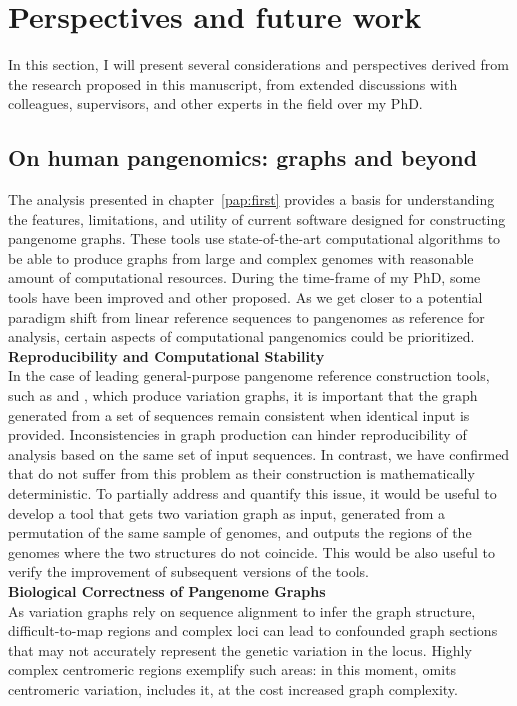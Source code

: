 
\chapter{Perspectives and future work}
\label{sec:perspectives}
In this section, I will present several considerations and perspectives derived from the research proposed in this manuscript, from extended discussions with colleagues, supervisors, and other experts in the field over my PhD.

\section{On human pangenomics: graphs and beyond}
The analysis presented in chapter~\ref{pap:first} provides a basis for understanding the features, limitations, and utility of current software designed for constructing pangenome graphs. These tools use state-of-the-art computational algorithms to be able to produce graphs from large and complex genomes with reasonable amount of computational resources. During the time-frame of my PhD, some tools have been improved and other proposed. As we get closer to a potential paradigm shift from linear reference sequences to pangenomes as reference for analysis, certain aspects of computational pangenomics could be prioritized. \\
\textbf{Reproducibility and Computational Stability}\\
In the case of leading general-purpose pangenome reference construction tools, such as \pggb and \mcactus, which produce variation graphs, it is important that the graph generated from a set of sequences remain consistent when identical input is provided. Inconsistencies in graph production can hinder reproducibility of analysis based on the same set of input sequences. In contrast, we have confirmed that \dbgs do not suffer from this problem as their construction is mathematically deterministic. To partially address and quantify this issue, it would be useful to develop a tool that gets two variation graph as input, generated from a permutation of the same sample of genomes, and outputs the regions of the genomes where the two structures do not coincide. This would be also useful to verify the improvement of subsequent versions of the tools.\\
\textbf{Biological Correctness of Pangenome Graphs}\\
As variation graphs rely on sequence alignment to infer the graph structure, difficult-to-map regions and complex loci can lead to confounded graph sections that may not accurately represent the genetic variation in the locus. Highly complex centromeric regions exemplify such areas: in this moment, \mcactus omits centromeric variation, \pggb includes it, at the cost increased graph complexity. \\
